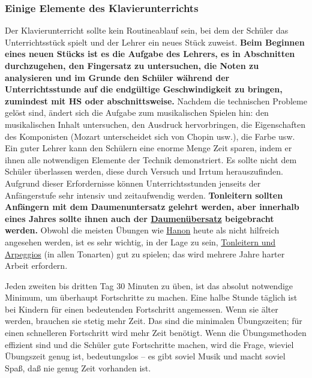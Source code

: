 
\subsubsection{Einige Elemente des Klavierunterrichts}
\label{c1iii16d}

Der Klavierunterricht sollte kein Routineablauf sein, bei dem der Schüler das Unterrichtsstück spielt und der Lehrer ein neues Stück zuweist.
\textbf{Beim Beginnen eines neuen Stücks ist es die Aufgabe des Lehrers, es in Abschnitten durchzugehen, den Fingersatz zu untersuchen, die Noten zu analysieren und im Grunde den Schüler während der Unterrichtsstunde auf die endgültige Geschwindigkeit zu bringen, zumindest mit HS oder abschnittsweise.}
Nachdem die technischen Probleme gelöst sind, ändert sich die Aufgabe zum musikalischen Spielen hin: den musikalischen Inhalt untersuchen, den Ausdruck hervorbringen, die Eigenschaften des Komponisten (Mozart unterscheidet sich von Chopin usw.), die Farbe usw.
Ein guter Lehrer kann den Schülern eine enorme Menge Zeit sparen, indem er ihnen alle notwendigen Elemente der Technik demonstriert.
Es sollte nicht dem Schüler überlassen werden, diese durch Versuch und Irrtum herauszufinden.
Aufgrund dieser Erfordernisse können Unterrichtsstunden jenseits der Anfängerstufe sehr intensiv und zeitaufwendig werden.
\textbf{Tonleitern sollten Anfängern mit dem Daumenuntersatz gelehrt werden, aber innerhalb eines Jahres sollte ihnen auch der \hyperref[c1iii5b]{Daumenübersatz} beigebracht werden.}
Obwohl die meisten Übungen wie \hyperref[c1iii7h]{Hanon} heute als nicht hilfreich angesehen werden, ist es sehr wichtig, in der Lage zu sein, \hyperref[c1iii5]{Tonleitern und Arpeggios} (in allen Tonarten)
gut zu spielen; das wird mehrere Jahre harter Arbeit erfordern.

Jeden zweiten bis dritten Tag 30 Minuten zu üben, ist das absolut notwendige Minimum, um überhaupt Fortschritte zu machen.
Eine halbe Stunde täglich ist bei Kindern für einen bedeutenden Fortschritt angemessen.
Wenn sie älter werden, brauchen sie stetig mehr Zeit.
Das sind die minimalen Übungszeiten; für einen schnelleren Fortschritt wird mehr Zeit benötigt.
Wenn die Übungsmethoden effizient sind und die Schüler gute Fortschritte machen, wird die Frage, wieviel Übungszeit genug ist, bedeutungslos -- es gibt soviel Musik und macht soviel Spaß, daß nie genug Zeit vorhanden ist.

